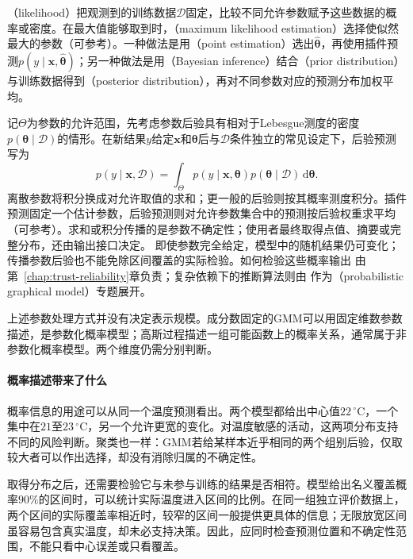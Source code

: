 （likelihood）把观测到的训练数据$\mathcal D$固定，比较不同允许参数赋予这些数据的概率或密度。在最大值能够取到时，（maximum likelihood estimation）选择使似然最大的参数（可参考）。一种做法是用（point estimation）选出$\hat{\bm{\theta}}$，再使用插件预测$p(y\mid\bm x,\hat{\bm{\theta}})$；另一种做法是用（Bayesian inference）结合（prior distribution）与训练数据得到（posterior distribution），再对不同参数对应的预测分布加权平均。

记$\Theta$为参数的允许范围，先考虑参数后验具有相对于Lebesgue测度的密度$p(\bm\theta\mid\mathcal D)$的情形。在新结果$y$给定$\bm x$和$\bm\theta$后与$\mathcal D$条件独立的常见设定下，后验预测写为
\[
  p(y\mid\bm x,\mathcal D)
  =\int_{\Theta} p(y\mid\bm x,\bm\theta)
    p(\bm\theta\mid\mathcal D)\,\mathrm d\bm\theta.
\]
离散参数将积分换成对允许取值的求和；更一般的后验则按其概率测度积分。插件预测固定一个估计参数，后验预测则对允许参数集合中的预测按后验权重求平均（可参考）。求和或积分传播的是参数不确定性；使用者最终取得点值、摘要或完整分布，还由输出接口决定。
即使参数完全给定，模型中的随机结果仍可变化；传播参数后验也不能免除区间覆盖的实际检验。如何检验这些概率输出
由第~\ref{chap:trust-reliability}章负责；复杂依赖下的推断算法则由
作为（probabilistic graphical model）专题展开。

上述参数处理方式并没有决定表示规模。成分数固定的GMM可以用固定维数参数描述，是参数化概率模型；高斯过程描述一组可能函数上的概率关系，通常属于非参数化概率模型。两个维度仍需分别判断。

\paragraph{概率描述带来了什么}

概率信息的用途可以从同一个温度预测看出。两个模型都给出中心值$22\,^{\circ}\mathrm{C}$，一个集中在$21$至$23\,^{\circ}\mathrm{C}$，另一个允许更宽的变化。对温度敏感的活动，这两项分布支持不同的风险判断。聚类也一样：GMM若给某样本近乎相同的两个组别后验，仅取较大者可以作出选择，却没有消除归属的不确定性。

取得分布之后，还需要检验它与未参与训练的结果是否相符。模型给出名义覆盖概率$90\%$的区间时，可以统计实际温度进入区间的比例。在同一组独立评价数据上，两个区间的实际覆盖率相近时，较窄的区间一般提供更具体的信息；无限放宽区间虽容易包含真实温度，却未必支持决策。因此，应同时检查预测位置和不确定性范围，不能只看中心误差或只看覆盖。

